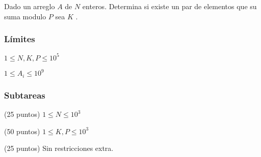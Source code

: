 Dado un arreglo \(A\) de \(N\) enteros. Determina si existe un par de elementos que su suma modulo \(P\) sea \(K\) .

\subsubsection*{Límites}
\begin{plimits}
	\item \(1\leq N,K,P\leq 10^5 \)
	\item \(1\leq A_i\leq 10^9 \)
\end{plimits}

\subsubsection*{Subtareas}
\begin{plimits}
	\item (25 puntos) \(1\leq N\leq 10^3 \)
	\item (50 puntos) \(1\leq K, P\leq 10^3 \)
	\item (25 puntos) Sin restricciones extra.
\end{plimits}
